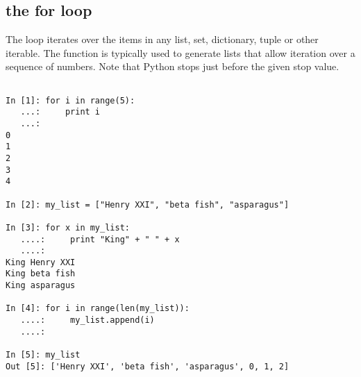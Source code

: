 \subsection*{the for loop}
\begin{example}

The  loop iterates over the items in any list, set, dictionary, tuple or other iterable. 
The  function is typically used to generate lists that allow iteration 
over a sequence of numbers. Note that Python stops just before the given stop value. 

\begin{lstlisting}

In [1]: for i in range(5):
   ...:     print i
   ...:     
0
1
2
3
4

In [2]: my_list = ["Henry XXI", "beta fish", "asparagus"]

In [3]: for x in my_list:
   ....:     print "King" + " " + x
   ....:     
King Henry XXI
King beta fish
King asparagus

In [4]: for i in range(len(my_list)):
   ....:     my_list.append(i)
   ....:     

In [5]: my_list
Out [5]: ['Henry XXI', 'beta fish', 'asparagus', 0, 1, 2]

\end{lstlisting}
\end{example}


